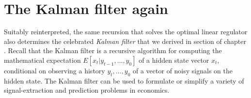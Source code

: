 \section{The Kalman filter again}\label{sec:Kalmanch4}%
  Suitably reinterpreted, the same recursion   that solves the optimal
linear regulator also determines the celebrated {\it Kalman filter} that we derived in section
of chapter .
%
%
Recall that the Kalman filter is a recursive algorithm
for computing  the mathematical expectation $E[ x_t \vert  y_{t-1}, \ldots,
y_0]$ of a hidden state  vector $x_t$, conditional on observing
a history $y_t, \ldots, y_0$ of a vector of noisy signals  on the
hidden state.   The Kalman filter can be used to formulate or
simplify a variety of signal-extraction and prediction
problems in economics.
%

